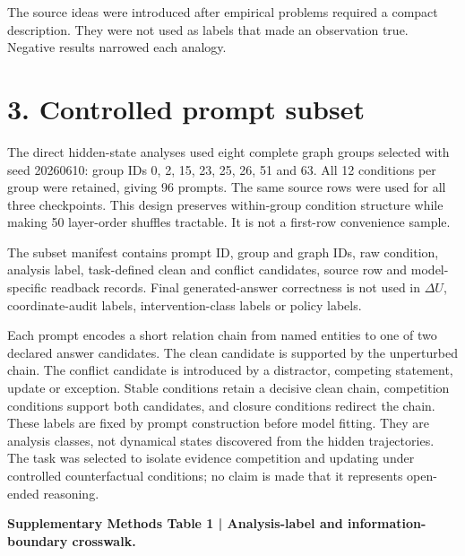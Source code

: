 \documentclass[10pt]{article}
\begin{document}
The source ideas were introduced after empirical problems required a compact description. They were not used as labels that made an observation true. Negative results narrowed each analogy.

\section*{3. Controlled prompt subset}

The direct hidden-state analyses used eight complete graph groups selected with seed 20260610: group IDs 0, 2, 15, 23, 25, 26, 51 and 63. All 12 conditions per group were retained, giving 96 prompts. The same source rows were used for all three checkpoints. This design preserves within-group condition structure while making 50 layer-order shuffles tractable. It is not a first-row convenience sample.

The subset manifest contains prompt ID, group and graph IDs, raw condition, analysis label, task-defined clean and conflict candidates, source row and model-specific readback records. Final generated-answer correctness is not used in \(\Delta U\), coordinate-audit labels, intervention-class labels or policy labels.

Each prompt encodes a short relation chain from named entities to one of two declared answer candidates. The clean candidate is supported by the unperturbed chain. The conflict candidate is introduced by a distractor, competing statement, update or exception. Stable conditions retain a decisive clean chain, competition conditions support both candidates, and closure conditions redirect the chain. These labels are fixed by prompt construction before model fitting. They are analysis classes, not dynamical states discovered from the hidden trajectories. The task was selected to isolate evidence competition and updating under controlled counterfactual conditions; no claim is made that it represents open-ended reasoning.

\textbf{Supplementary Methods Table 1 | Analysis-label and information-boundary crosswalk.}
\end{document}
